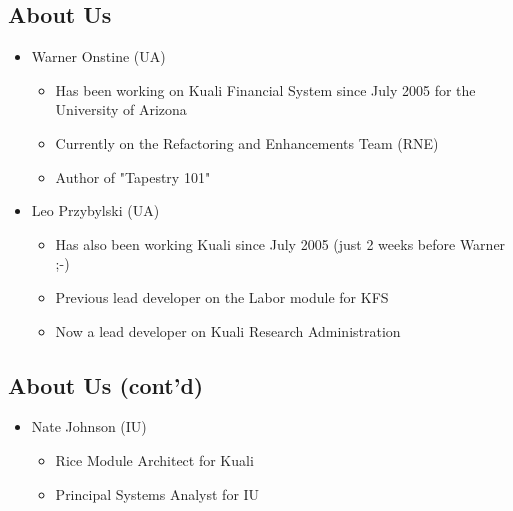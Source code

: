 \documentclass[12pt,notitlepage]{article}
\author{Warner Onstine and Leo Przybylski}
\begin{document}
  \W \begin{s5presentation}
  \maketitle
  \W \begin{s5slide}
    \W \section{About Us}
    \begin{ifhtml}
        \begin{itemize}
        \item Warner Onstine (UA)
            \begin{itemize}
            \item Has been working on Kuali Financial System since July 2005 for the University of Arizona
            \item Currently on the Refactoring and Enhancements Team (RNE)
            \item Author of "Tapestry 101"
            \end{itemize}
        \item Leo Przybylski (UA)
            \begin{itemize}
            \item Has also been working Kuali since July 2005 (just 2 weeks before Warner ;-)
            \item Previous lead developer on the Labor module for KFS
            \item Now a lead developer on Kuali Research Administration
            \end{itemize}
        \end{itemize}
    \end{ifhtml} 
  \W \end{s5slide}
  \W \begin{s5slide}
      \W \section{About Us (cont'd)}
      \begin{ifhtml}
          \begin{itemize}
          \item Nate Johnson (IU)
              \begin{itemize}
              \item Rice Module Architect for Kuali
              \item Principal Systems Analyst for IU

\end{itemize}
\end{itemize}
\end{ifhtml}
\end{s5slide}
\end{s5presentation}
\end{document}
